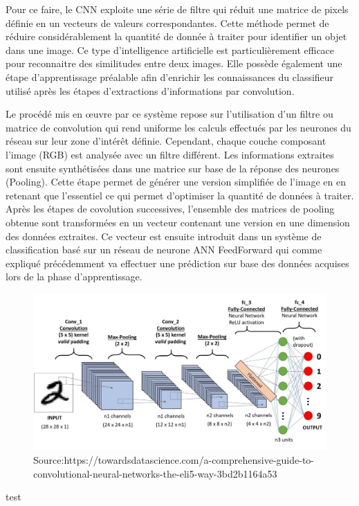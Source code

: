 \documentclass[a4paper,12pt]{article} %
\begin{document}
\par
	Pour ce faire, le CNN exploite une série de filtre qui réduit une matrice de pixels définie en un vecteurs de valeurs correspondantes. Cette méthode permet de réduire considérablement la quantité de donnée à traiter pour identifier un objet dans une image. Ce type d’intelligence artificielle est particulièrement efficace pour reconnaitre des similitudes entre deux images. Elle possède également une étape d’apprentissage préalable afin d’enrichir les connaissances du classifieur utilisé après les étapes d’extractions d’informations par convolution. \newline
\par
Le procédé mis en œuvre par ce système repose sur l’utilisation d’un filtre ou matrice de convolution qui rend uniforme les calculs effectués par les neurones du réseau sur leur zone d’intérêt définie. Cependant, chaque couche composant l’image (RGB) est analysée avec un filtre différent. Les informations extraites sont ensuite synthétisées dans une matrice sur base de la réponse des neurones (Pooling). Cette étape permet de générer une version simplifiée de l’image en en retenant que l’essentiel ce qui permet d’optimiser la quantité de données à traiter. Après les étapes de covolution successives, l’ensemble des matrices de pooling obtenue sont transformées en un vecteur contenant une version en une dimension des données extraites. Ce vecteur est ensuite introduit dans un système de classification basé sur un réseau de neurone ANN FeedForward qui comme expliqué précédemment va effectuer une prédiction sur base des données acquises lors de la phase d’apprentissage. \newline
\begin{figure}[h] %
  \centering %
  \includegraphics[scale=0.20]{CNN.jpeg} %
  \caption{Source:https://towardsdatascience.com/a-comprehensive-guide-to-convolutional-neural-networks-the-eli5-way-3bd2b1164a53} %
\end{figure}
\newpage
test
\newpage
\end{document}
